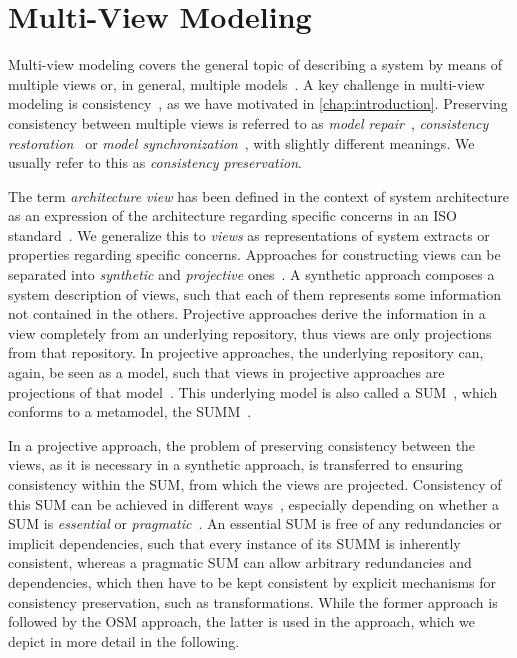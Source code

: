 \section{Multi-View Modeling}
\label{chap:foundations:multiview}

Multi-view modeling covers the general topic of describing a system by means of multiple views or, in general, multiple models~\cite{reineke2019ProblemMultiView-SoSym}.
A key challenge in multi-view modeling is consistency~\cite{reineke2019ProblemMultiView-SoSym}, as we have motivated in \autoref{chap:introduction}.
Preserving consistency between multiple views is referred to as \emph{model repair}~\cite{macedo2017ModelRepairClassification-TSE}, \emph{consistency restoration}~\cite{stevens2010sosym, kramer2017a} or \emph{model synchronization}~\cite{diskin2016Taxonomy-JSS}, with slightly different meanings.
We usually refer to this as \emph{consistency preservation}.

The term \emph{architecture view} has been defined in the context of system architecture as an expression of the architecture regarding specific concerns in an ISO standard~\cite[p.~2]{iso42010}.
We generalize this to \emph{views} as representations of system extracts or properties regarding specific concerns.
Approaches for constructing views can be separated into \emph{synthetic} and \emph{projective} ones~\cite[p.~22]{iso42010}.
A synthetic approach composes a system description of views, such that each of them represents some information not contained in the others.
Projective approaches derive the information in a view completely from an underlying repository, thus views are only projections from that repository.
In projective approaches, the underlying repository can, again, be seen as a model, such that views in projective approaches are projections of that model~.
This underlying model is also called a \gls{SUM}~\cite[p.~210]{atkinson2010a}, which conforms to a metamodel, the \gls{SUMM}~.

In a projective approach, the problem of preserving consistency between the views, as it is necessary in a synthetic approach, is transferred to ensuring consistency within the \gls{SUM}, from which the views are projected.
Consistency of this \gls{SUM} can be achieved in different ways~, especially depending on whether a \gls{SUM} is \emph{essential} or \emph{pragmatic}~\cite{atkinson2015realizationMultiView-EDOC}.
An essential \gls{SUM} is free of any redundancies or implicit dependencies, such that every instance of its \gls{SUMM} is inherently consistent, whereas a pragmatic \gls{SUM} can allow arbitrary redundancies and dependencies, which then have to be kept consistent by explicit mechanisms for consistency preservation, such as transformations.
While the former approach is followed by the \acrlong{OSM} approach, the latter is used in the \vitruv approach, which we depict in more detail in the following.


